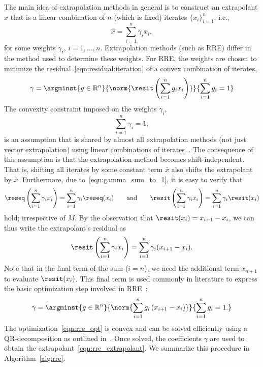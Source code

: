 The main idea of extrapolation methods in general is to construct an extrapolant $\widehat{x}$ that is a linear combination of $n$ (which is fixed) iterates $\{ x_i \}_{i=1}^{n}$, i.e.,
\begin{equation}
	\widehat{x} = \sum_{i=1}^{n} \gamma_i x_i,
	\label{eqn:rre_extrapolant}
\end{equation}
for some weights $\gamma_i$, $i = 1,\ldots, n$.
Extrapolation methods (such as \ac{RRE}) differ in the method used to determine these weights.
For \ac{RRE}, the weights are chosen to minimize the
residual~\eqref{eqn:residual:iteration} of a convex combination of iterates,
\begin{equation}
	\gamma = \argminst{%
		g\in\mathbb R^n
	}{%
		\norm{ \resit \left( \sum_{i=1}^{n} g_i x_i \right) }
	}{%
		\sum_{i=1}^{n} g_i = 1
	}
	\label{eqn:residual_extrapolant}
\end{equation}
The convexity constraint imposed on the weights $\gamma_i$,
\begin{equation}
	\sum_{i=1}^{n} \gamma_i = 1,
	\label{eqn:gamma_sum_to_1}
\end{equation}
is an assumption that is shared by almost all extrapolation methods (not just vector extrapolation) using linear combinations of iterates~\cite[Section~0.3]{sidi2003practical}.
The consequence of this assumption is that the extrapolation method becomes shift-independent.
That is, shifting all iterates by some constant term $\bar{x}$ also shifts the extrapolant by $\bar{x}$.
Furthermore,
due to~\eqref{eqn:gamma_sum_to_1},
it is easy to verify that
\begin{equation}
	\reseq\left(\sum_{i=1}^n \gamma_i x_i\right) = \sum_{i=1}^n \gamma_i \reseq(x_i)
	\qquad\text{and}\qquad
	\resit\left(\sum_{i=1}^n \gamma_i x_i\right) = \sum_{i=1}^n \gamma_i \resit(x_i)
\end{equation}
hold; irrespective of \(M\).
By the observation that $\resit(x_i) = x_{i+1} - x_i$,
we can thus write the extrapolant's residual as
\begin{equation}
	\resit\left( \sum_{i=1}^{n} \gamma_i x_i \right)
	= \sum_{i=1}^{n} \gamma_i (x_{i+1} - x_i).
\end{equation}
Note that in the final term of the sum ($i=n$),
we need the additional term $x_{n+1}$ to evaluate $\resit(x_i)$.
This final term is used commonly in literature to express the basic optimization step involved in \ac{RRE}~\cite{el2013vector, kaniel1974least, sidi2020convergence}:
\begin{equation}
	\gamma = \argminst{%
		g\in\mathbb R^n
	}{%
		\norm{ \sum_{i=1}^{n} g_i \left( x_{i+1} - x_i \right) }
	}{%
		\sum_{i=1}^{n} g_i = 1.
	}
	\label{eqn:rre_opt}
\end{equation}
The optimization~\eqref{eqn:rre_opt} is convex and can be solved efficiently using a QR-decomposition as outlined in~\cite{sidi1991efficient}.
Once solved, the coefficients $\gamma$ are used to obtain the extrapolant~\eqref{eqn:rre_extrapolant}.
We summarize this procedure in Algorithm~\ref{alg:rre}.


